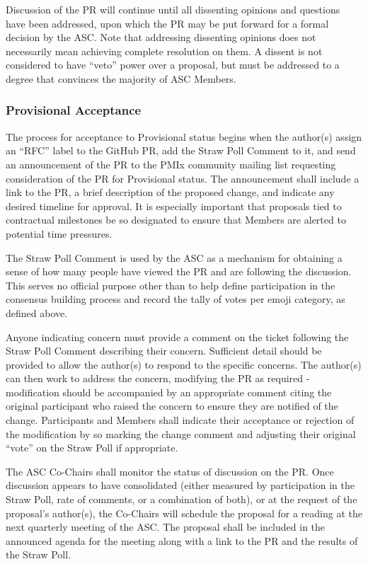 \documentclass{article}
\begin{document}
Discussion of the PR will continue until all dissenting opinions and
questions have been addressed, upon which the PR may be put forward for
a formal decision by the ASC. Note that addressing dissenting opinions does
not necessarily mean achieving complete resolution on them. A dissent is
not considered to have ``veto'' power over a proposal, but must be
addressed to a degree that convinces the majority of ASC Members.

\hypertarget{provisional-acceptance}{%
\subsubsection{Provisional Acceptance}%
\label{provisional-acceptance}}

The process for acceptance to Provisional status begins when the
author(s) assign an ``RFC'' label to the GitHub PR, add the
Straw Poll Comment to it, and send an announcement of the
PR to the PMIx community mailing list requesting consideration of the PR
for Provisional status. The announcement shall include a link to the PR,
a brief description of the proposed change, and indicate any desired
timeline for approval. It is especially important that proposals tied to
contractual milestones be so designated to ensure that Members are
alerted to potential time pressures.

The Straw Poll Comment is used by the ASC as a mechanism for
obtaining a sense of how many people have viewed the PR and are
following the discussion. This serves no official purpose other than to
help define participation in the consensus building process and record
the tally of votes per emoji category, as defined above.

Anyone indicating concern must provide a comment on the ticket following
the Straw Poll Comment describing their concern. Sufficient
detail should be provided to allow the author(s) to respond to the
specific concerns. The author(s) can then work to address the concern,
modifying the PR as required - modification should be accompanied by an
appropriate comment citing the original participant who raised the
concern to ensure they are notified of the change. Participants and
Members shall indicate their acceptance or rejection of the modification
by so marking the change comment and adjusting their original ``vote''
on the Straw Poll if appropriate.

The ASC Co-Chairs shall monitor the status of discussion on the PR. Once
discussion appears to have consolidated (either measured by
participation in the Straw Poll, rate of comments, or a combination of
both), or at the request of the proposal's author(s), the Co-Chairs will
schedule the proposal for a reading at the next quarterly meeting of the
ASC. The proposal shall be included in the announced agenda for the
meeting along with a link to the PR and the results of the Straw Poll.
\end{document}
